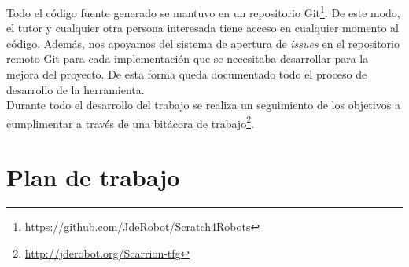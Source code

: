 Todo el código fuente generado se mantuvo en un repositorio Git\footnote{\url{https://github.com/JdeRobot/Scratch4Robots}}. De este modo, el tutor y cualquier otra persona interesada tiene acceso en cualquier momento al código. Además, nos apoyamos del sistema de apertura de \textit{issues} en el repositorio remoto Git para cada implementación que se necesitaba desarrollar para la mejora del proyecto. De esta forma queda documentado todo el proceso de desarrollo de la herramienta.\\

Durante todo el desarrollo del trabajo se realiza un seguimiento de los objetivos a cumplimentar a través de una bitácora de trabajo\footnote{\url{http://jderobot.org/Scarrion-tfg}}.

\section{Plan de trabajo}
\label{sec:plan}

